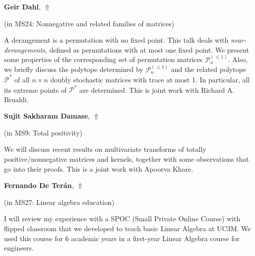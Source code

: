 \documentclass[ILAS2025-program.tex]{subfiles}
\begin{document}
\hypertarget{down0200}{}\begin{ilasabstract}
    
\textbf{Geir Dahl},  \hfill \hyperlink{up0200}{$\Uparrow$}
    
    
(in {\color{mstitle}MS24: Nonnegative and related families of matrices})
        
\mtskip
    A derangement is a permutation with no fixed point. This talk deals with  {\em near-derangements}, defined as permutations with at most one fixed point. We present some properties of  the corresponding set of permutation matrices $\mathcal{P}^{(\le 1)}_n$. 
  Also, we briefly discuss  the polytope determined by $\mathcal{P}^{(\le 1)}_n$ and the related polytope $\mathcal{P}^*$ of  all $n\times n$  doubly stochastic matrices with trace at most 1.
  In particular, all its  extreme points of $\mathcal{P}^*$ are determined. 
This is joint work with Richard A. Brualdi.

\end{ilasabstract}
    

\hypertarget{down0121}{}\begin{ilasabstract}
    
\textbf{Sujit Sakharam Damase},  \hfill \hyperlink{up0121}{$\Uparrow$}
    
    
(in {\color{mstitle}MS9: Total positivity})
        
\mtskip
    We will discuss recent results on multivariate transforms of totally positive/nonnegative matrices and kernels, together with some observations that go into their proofs. This is a joint work with Apoorva Khare.

\end{ilasabstract}
    

\hypertarget{down0259}{}\begin{ilasabstract}
    
\textbf{Fernando De Terán},  \hfill \hyperlink{up0259}{$\Uparrow$}
    
    
(in {\color{mstitle}MS27: Linear algebra education})
        
\mtskip
    I will review my experience with a SPOC (Small Private Online Course) with flipped classroom that we developed to teach basic Linear Algebra at UC3M. We used this course for 6 academic years in a first-year Linear Algebra course for engineers.
\end{ilasabstract}
    
\end{document}

